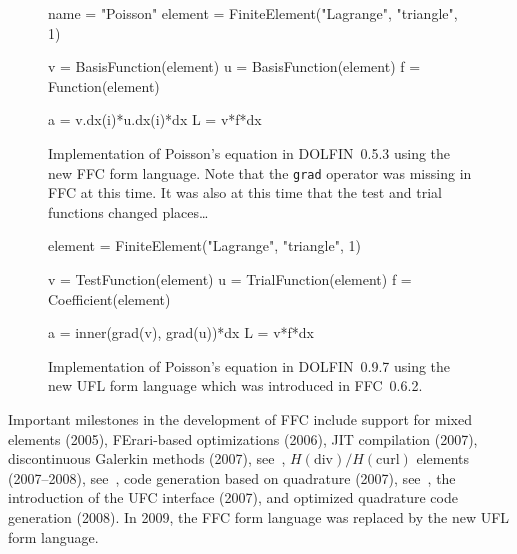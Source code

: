 \begin{figure}
  \begin{center}
\begin{code}
  name = "Poisson"
  element = FiniteElement("Lagrange", "triangle", 1)

  v = BasisFunction(element)
  u = BasisFunction(element)
  f = Function(element)

  a = v.dx(i)*u.dx(i)*dx
  L = v*f*dx
\end{code}
  \caption{Implementation of Poisson's equation in DOLFIN~0.5.3 using
    the new FFC form language. Note that the \texttt{grad} operator
    was missing in FFC at this time. It was also at this time that the
    test and trial functions changed places\ldots}
  \label{tab:poisson,after}
  \end{center}
\end{figure}

\begin{figure}
  \begin{center}
\begin{code}
  element = FiniteElement("Lagrange", "triangle", 1)

  v = TestFunction(element)
  u = TrialFunction(element)
  f = Coefficient(element)

  a = inner(grad(v), grad(u))*dx
  L = v*f*dx
\end{code}
  \caption{Implementation of Poisson's equation in DOLFIN~0.9.7 using
    the new UFL form language which was introduced in FFC~0.6.2.}
  \label{tab:poisson,ufl}
  \end{center}
\end{figure}

Important milestones in the development of FFC include support for
mixed elements (2005), FErari-based optimizations (2006), JIT
compilation (2007), discontinuous Galerkin methods (2007),
see~\cite{OlgaardLoggWells2008}, $H(\mathrm{div})/H(\mathrm{curl})$
elements (2007--2008), see~\cite{RognesKirbyLogg2009}, code generation
based on quadrature (2007), see~\cite{OlgaardWells2010}, the introduction
of the UFC interface (2007), and optimized quadrature code generation
(2008). In 2009, the FFC form language was replaced by the new UFL
form language.

